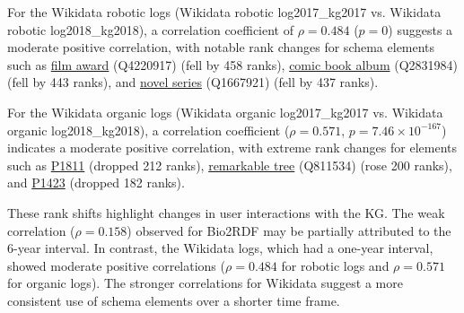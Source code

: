 \documentclass[sw]{iosart2x}
\begin{document}
For the Wikidata robotic logs (Wikidata robotic log2017\_kg2017 vs. Wikidata robotic log2018\_kg2018), a correlation coefficient of $\rho = 0.484$ ($p = 0$) suggests a
moderate positive correlation, with notable rank changes for schema elements such as 
\href{http://www.wikidata.org/entity/Q4220917}{film award} (Q4220917) (fell by 458 ranks), 
\href{http://www.wikidata.org/entity/Q2831984}{comic book album} (Q2831984) (fell by 443 ranks), and 
\href{http://www.wikidata.org/entity/Q1667921}{novel series} (Q1667921) (fell by 437 ranks).

For the Wikidata organic logs (Wikidata organic log2017\_kg2017 vs. Wikidata organic log2018\_kg2018), a correlation coefficient ($\rho = 0.571$, $p = 7.46 \times 10^{-167}$) indicates a moderate positive correlation, with extreme rank changes for elements such as 
\href{http://www.wikidata.org/prop/direct/P1811}{P1811} (dropped 212 ranks), 
\href{http://www.wikidata.org/entity/Q811534}{remarkable tree} (Q811534) (rose 200 ranks), and 
\href{http://www.wikidata.org/prop/direct/P1423}{P1423} (dropped 182 ranks).

These rank shifts highlight changes in user interactions with the KG. The weak correlation ($\rho = 0.158$) observed for Bio2RDF may be partially attributed to the 6-year interval. In contrast, the Wikidata logs, which had a one-year interval, showed moderate positive correlations ($\rho = 0.484$ for robotic logs and $\rho = 0.571$ for organic logs). The stronger correlations for Wikidata suggest a more consistent use of schema elements over a shorter time frame.
\end{document}
